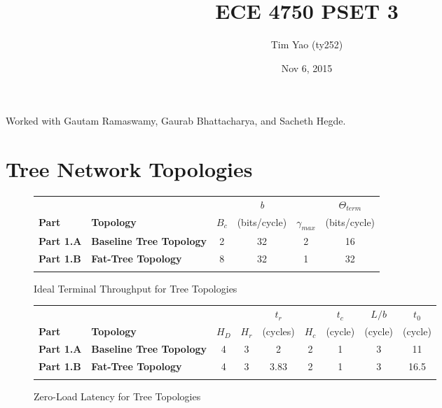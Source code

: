 \documentclass[10pt]{article}
\title{ECE 4750 PSET 3}
\author{Tim Yao (ty252)}
\date{Nov 6, 2015}
\begin{document}
\maketitle
\newcommand*{\tableindent}{\hspace*{0.3cm}}%
Worked with Gautam Ramaswamy, Gaurab Bhattacharya, and Sacheth Hegde.
\section{Tree Network Topologies} 

\begin{figure}[H]
\centering
\begin{tabular}{@{\extracolsep{3pt}}llcccc@{}}
\Xhline{2\arrayrulewidth}
& & & \textit{b} & & $\Theta_{term}$ \\
\textbf{Part} & \textbf{Topology} & $B_c$ & {(bits/cycle)} & $\gamma_{max}$ & {(bits/cycle)} \\
\hline
\textbf{Part 1.A} & \textbf{Baseline Tree Topology} & 2 & 32 & 2 & 16 \\
\hline
\textbf{Part 1.B} & \textbf{Fat-Tree Topology} & 8 & 32 & 1 & 32  \\
\Xhline{2\arrayrulewidth}
\end{tabular}
\caption{Ideal Terminal Throughput for Tree Topologies}
\end{figure}

\begin{figure}[H]
\centering
\begin{tabular}{@{\extracolsep{3pt}}llccccccc@{}}
\Xhline{2\arrayrulewidth}
& & & & \textit{$t_r$} & & \textit{$t_c$} & \textit{$L/b$} & \textit{$t_0$}\\
\textbf{Part} & \textbf{Topology} & \textit{$H_D$} & \textit{$H_r$} & (cycles) & \textit{$H_c$} & (cycle) & (cycle) & (cycle) \\
\hline
\textbf{Part 1.A} & \textbf{Baseline Tree Topology} & 4 & 3 & 2 & 2 & 1 & 3 & 11\\
\hline
\textbf{Part 1.B} & \textbf{Fat-Tree Topology} & 4 & 3 & 3.83 & 2 & 1 & 3 & 16.5\\
\Xhline{2\arrayrulewidth}
\end{tabular}
\caption{Zero-Load Latency for Tree Topologies}
\end{figure}
\end{document}

